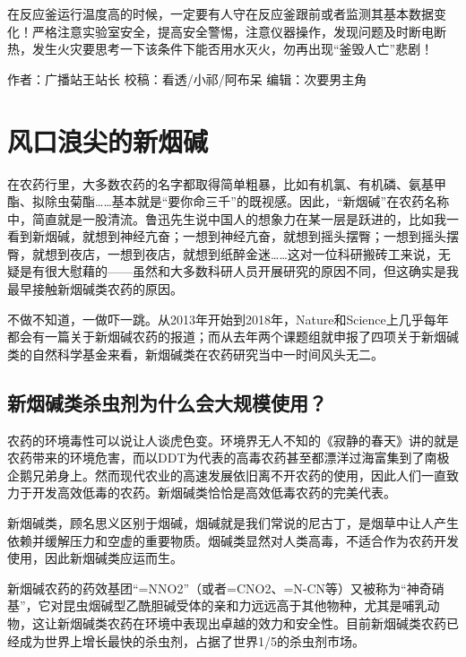 \documentclass[
]{book}
\begin{document}
在反应釜运行温度高的时候，一定要有人守在反应釜跟前或者监测其基本数据变化！严格注意实验室安全，提高安全警惕，注意仪器操作，发现问题及时断电断热，发生火灾要思考一下该条件下能否用水灭火，勿再出现``釜毁人亡''悲剧！

作者：广播站王站长
校稿：看透/小祁/阿布呆
编辑：次要男主角

\hypertarget{ux98ceux53e3ux6d6aux5c16ux7684ux65b0ux70dfux78b1}{%
\section{风口浪尖的新烟碱}\label{ux98ceux53e3ux6d6aux5c16ux7684ux65b0ux70dfux78b1}}

在农药行里，大多数农药的名字都取得简单粗暴，比如有机氯、有机磷、氨基甲酯、拟除虫菊酯\ldots\ldots 基本就是``要你命三千''的既视感。因此，``新烟碱''在农药名称中，简直就是一股清流。鲁迅先生说中国人的想象力在某一层是跃进的，比如我一看到新烟碱，就想到神经亢奋；一想到神经亢奋，就想到摇头摆臀；一想到摇头摆臀，就想到夜店，一想到夜店，就想到纸醉金迷\ldots\ldots 这对一位科研搬砖工来说，无疑是有很大慰藉的------虽然和大多数科研人员开展研究的原因不同，但这确实是我最早接触新烟碱类农药的原因。

不做不知道，一做吓一跳。从2013年开始到2018年，Nature和Science上几乎每年都会有一篇关于新烟碱农药的报道；而从去年两个课题组就申报了四项关于新烟碱类的自然科学基金来看，新烟碱类在农药研究当中一时间风头无二。

\hypertarget{ux65b0ux70dfux78b1ux7c7bux6740ux866bux5242ux4e3aux4ec0ux4e48ux4f1aux5927ux89c4ux6a21ux4f7fux7528}{%
\subsection{新烟碱类杀虫剂为什么会大规模使用？}\label{ux65b0ux70dfux78b1ux7c7bux6740ux866bux5242ux4e3aux4ec0ux4e48ux4f1aux5927ux89c4ux6a21ux4f7fux7528}}

农药的环境毒性可以说让人谈虎色变。环境界无人不知的《寂静的春天》讲的就是农药带来的环境危害，而以DDT为代表的高毒农药甚至都漂洋过海富集到了南极企鹅兄弟身上。然而现代农业的高速发展依旧离不开农药的使用，因此人们一直致力于开发高效低毒的农药。新烟碱类恰恰是高效低毒农药的完美代表。

新烟碱类，顾名思义区别于烟碱，烟碱就是我们常说的尼古丁，是烟草中让人产生依赖并缓解压力和空虚的重要物质。烟碱类显然对人类高毒，不适合作为农药开发使用，因此新烟碱类应运而生。

新烟碱农药的药效基团``=NNO2''（或者=CNO2、=N-CN等）又被称为``神奇硝基''，它对昆虫烟碱型乙酰胆碱受体的亲和力远远高于其他物种，尤其是哺乳动物，这让新烟碱类农药在环境中表现出卓越的效力和安全性。目前新烟碱类农药已经成为世界上增长最快的杀虫剂，占据了世界1/5的杀虫剂市场。
\end{document}
